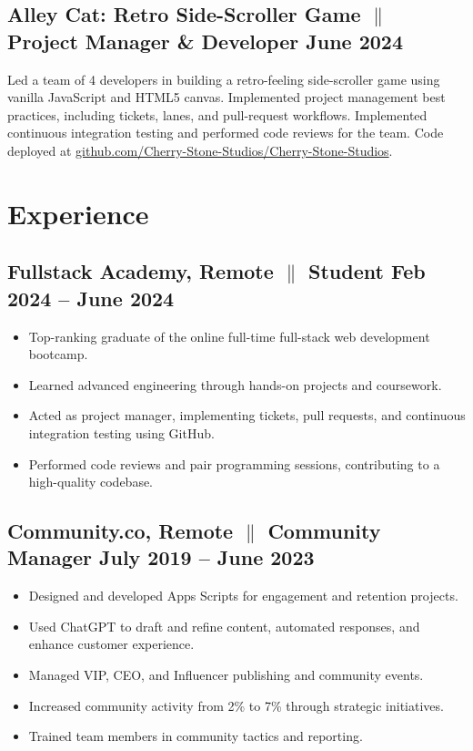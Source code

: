\documentclass[a4paper,10pt]{article}
\begin{document}
\subsection{Alley Cat: Retro Side-Scroller Game {$\parallel$}{
                  Project Manager
                  \& Developer}
      \hfill \textbf{June 2024}
}
{Led a team of 4 developers in building a retro-feeling
      side-scroller game using vanilla JavaScript and HTML5 canvas.
      Implemented
      project management best practices, including tickets, lanes, and
      pull-request
      workflows. Implemented continuous integration testing and
      performed
      code reviews for the team. Code deployed at \href{https://github.com/Cherry-Stone-Studios/Cherry-Stone-Studios}{github.com/Cherry-Stone-Studios/Cherry-Stone-Studios}.}

\section{Experience}

\subsection{Fullstack Academy, Remote {$\parallel$}{ Student} \hfill
      \textbf{Feb
            2024 – June
            2024}}
\begin{itemize}
      \item Top-ranking graduate of the online full-time full-stack web
            development
            bootcamp.
      \item Learned advanced engineering through
            hands-on
            projects and coursework.
      \item Acted as project manager, implementing tickets, pull requests, and
            continuous integration testing using GitHub.
      \item Performed code reviews and pair programming sessions, contributing
            to a high-quality codebase.
\end{itemize}

\subsection{Community.co, Remote {$\parallel$}{ Community Manager} \hfill
      \textbf{July 2019 – June
            2023}}
\begin{itemize}
      \item Designed and developed Apps Scripts for engagement and retention
            projects.
      \item Used ChatGPT to draft and refine content, automated responses, and enhance customer experience.
      \item Managed VIP, CEO, and Influencer publishing and community
            events.
      \item Increased community activity from 2\% to 7\% through
            strategic
            initiatives.
      \item Trained team members in community tactics and reporting.
\end{itemize}
\end{document}
